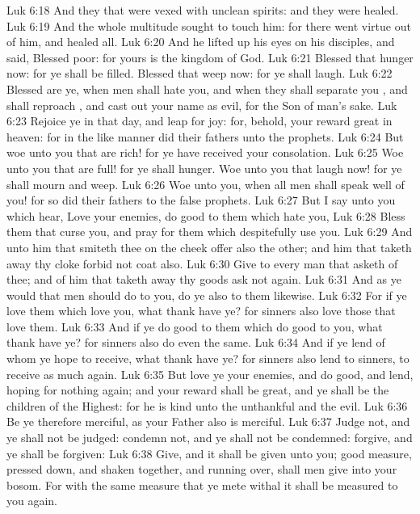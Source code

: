 \vs Luk 6:18 And they that were vexed with unclean spirits: and they were healed.
\vs Luk 6:19 And the whole multitude sought to touch him: for there went virtue out of him, and healed  all.
\vs Luk 6:20 And he lifted up his eyes on his disciples, and said, Blessed  poor: for yours is the kingdom of God.
\vs Luk 6:21 Blessed  that hunger now: for ye shall be filled. Blessed  that weep now: for ye shall laugh.
\vs Luk 6:22 Blessed are ye, when men shall hate you, and when they shall separate you , and shall reproach , and cast out your name as evil, for the Son of man's sake.
\vs Luk 6:23 Rejoice ye in that day, and leap for joy: for, behold, your reward  great in heaven: for in the like manner did their fathers unto the prophets.
\vs Luk 6:24 But woe unto you that are rich! for ye have received your consolation.
\vs Luk 6:25 Woe unto you that are full! for ye shall hunger. Woe unto you that laugh now! for ye shall mourn and weep.
\vs Luk 6:26 Woe unto you, when all men shall speak well of you! for so did their fathers to the false prophets.
\vs Luk 6:27 But I say unto you which hear, Love your enemies, do good to them which hate you,
\vs Luk 6:28 Bless them that curse you, and pray for them which despitefully use you.
\vs Luk 6:29 And unto him that smiteth thee on the  cheek offer also the other; and him that taketh away thy cloke forbid not  coat also.
\vs Luk 6:30 Give to every man that asketh of thee; and of him that taketh away thy goods ask  not again.
\vs Luk 6:31 And as ye would that men should do to you, do ye also to them likewise.
\vs Luk 6:32 For if ye love them which love you, what thank have ye? for sinners also love those that love them.
\vs Luk 6:33 And if ye do good to them which do good to you, what thank have ye? for sinners also do even the same.
\vs Luk 6:34 And if ye lend  of whom ye hope to receive, what thank have ye? for sinners also lend to sinners, to receive as much again.
\vs Luk 6:35 But love ye your enemies, and do good, and lend, hoping for nothing again; and your reward shall be great, and ye shall be the children of the Highest: for he is kind unto the unthankful and  the evil.
\vs Luk 6:36 Be ye therefore merciful, as your Father also is merciful.
\vs Luk 6:37 Judge not, and ye shall not be judged: condemn not, and ye shall not be condemned: forgive, and ye shall be forgiven:
\vs Luk 6:38 Give, and it shall be given unto you; good measure, pressed down, and shaken together, and running over, shall men give into your bosom. For with the same measure that ye mete withal it shall be measured to you again.

